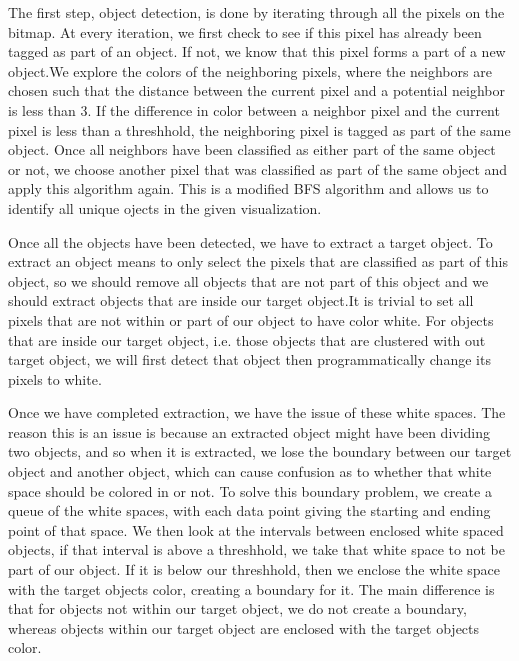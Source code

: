 The first step, object detection, is done by iterating through all the pixels on the bitmap. At every iteration, we first check to see if this pixel has already been tagged as part of an object. If not, we know that this pixel forms a part of a new object.We explore the colors of the neighboring pixels, where the neighbors are chosen such that the distance between the current pixel and a potential neighbor is less than 3. If the difference in color between a neighbor pixel and the current pixel is less than a threshhold, the neighboring pixel is tagged as part of the same object. Once all neighbors have been classified as either part of the same object or not, we choose another pixel that was classified as part of the same object and apply this algorithm again. This is a modified BFS algorithm and allows us to identify all unique ojects in the given visualization.

Once all the objects have been detected, we have to extract a target object. To extract an object means to only select the pixels that are classified as part of this object, so we should remove all objects that are not part of this object and we should extract objects that are inside our target object.It is trivial to set all pixels that are not within or part of our object to have color white. For objects that are inside our target object, i.e. those objects that are clustered with out target object, we will first detect that object then programmatically change its pixels to white.

Once we have completed extraction, we have the issue of these white spaces. The reason this is an issue is because an extracted object might have been dividing two objects, and so when it is extracted, we lose the boundary between our target object and another object, which can cause confusion as to whether that white space should be colored in or not. To solve this boundary problem, we create a queue of the white spaces, with each data point giving the starting and ending point of that space. We then look at the intervals between enclosed white spaced objects, if that interval is above a threshhold, we take that white space to not be part of our object. If it is below our threshhold, then we enclose the white space with the target objects color, creating a boundary for it. The main difference is that for objects not within our target object, we do not create a boundary, whereas objects within our target object are enclosed with the target objects color.\par
